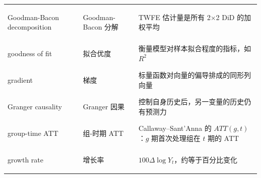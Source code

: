 \begin{longtable}{@{}>{\bfseries\boldmath\raggedright\arraybackslash}p{4.6cm}>{\raggedright\arraybackslash}p{3.2cm}>{\raggedright\arraybackslash}p{\dimexpr\textwidth-7.8cm-4\tabcolsep\relax}@{}}
Goodman-Bacon decomposition & Goodman-Bacon 分解 & TWFE 估计量是所有 2$\times$2 DiD 的加权平均 \\
goodness of fit & 拟合优度 & 衡量模型对样本拟合程度的指标，如 $R^2$ \\
gradient & 梯度 & 标量函数对向量的偏导排成的同形列向量 \\
Granger causality & Granger 因果 & 控制自身历史后，另一变量的历史仍有预测力 \\
group-time ATT & 组-时期 ATT & Callaway--Sant'Anna 的 $ATT(g,t)$：$g$ 期首次处理组在 $t$ 期的 ATT \\
growth rate & 增长率 & $100\Delta\log Y_t$，约等于百分比变化 \\
\end{longtable}

\par{}\ifdim\dimexpr\pagegoal-\pagetotal\relax<16\baselineskip\newpage\fi
